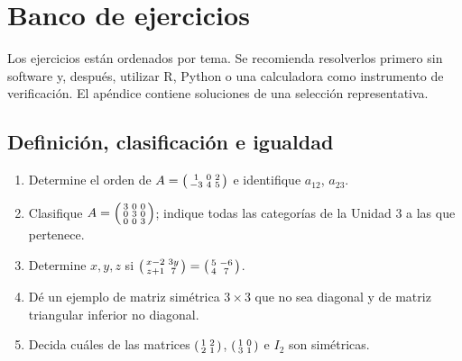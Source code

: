 \documentclass[12pt]{article}
\theoremstyle{remark}
\newcounter{contadorEjercicio}
\newenvironment{listaejercicios}{\begin{enumerate}[label=\textbf{E\arabic*.},leftmargin=2.4em,itemsep=0.52em]\setcounter{enumi}{\value{contadorEjercicio}}}{\setcounter{contadorEjercicio}{\value{enumi}}\end{enumerate}}
\begin{document}
\section{Banco de ejercicios}
Los ejercicios están ordenados por tema. Se recomienda resolverlos primero sin software y, después, utilizar R, Python o una calculadora como instrumento de verificación. El apéndice contiene soluciones de una selección representativa.

\subsection{Definición, clasificación e igualdad}
\begin{listaejercicios}
\item Determine el orden de $A=\begin{psmallmatrix}1&0&2\\-3&4&5\end{psmallmatrix}$ e identifique $a_{12}$, $a_{23}$.
\item Clasifique $A=\begin{psmallmatrix}3&0&0\\0&3&0\\0&0&3\end{psmallmatrix}$; indique todas las categorías de la Unidad 3 a las que pertenece.
\item Determine $x,y,z$ si $\begin{psmallmatrix}x-2&3y\\z+1&7\end{psmallmatrix}=\begin{psmallmatrix}5&-6\\4&7\end{psmallmatrix}$.
\item Dé un ejemplo de matriz simétrica $3\times3$ que no sea diagonal y de matriz triangular inferior no diagonal.
\item Decida cuáles de las matrices $\begin{psmallmatrix}1&2\\2&1\end{psmallmatrix}$, $\begin{psmallmatrix}1&0\\3&1\end{psmallmatrix}$ e $I_2$ son simétricas.
\end{listaejercicios}
\end{document}
